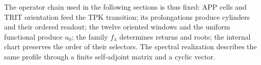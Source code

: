 The operator chain used in the following sections is thus fixed: APP cells and TRIT orientation feed the TPK transition; its prolongations produce cylinders and their ordered readout; the twelve oriented windows and the uniform functional produce \(u_0\); the family \(f_\lambda\) determines returns and roots; the internal chart preserves the order of their selectors. The spectral realization describes the same profile through a finite self-adjoint matrix and a cyclic vector.
